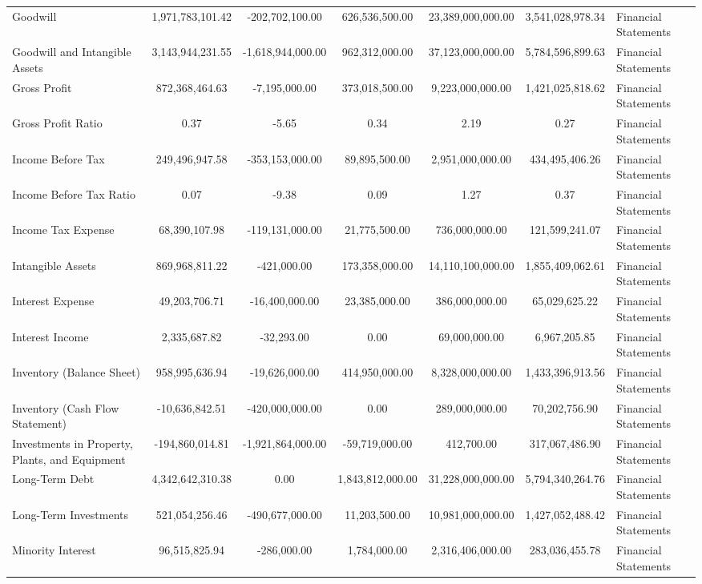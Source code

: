 \begin{tabular}{lccccc}
Goodwill & 1,971,783,101.42 & -202,702,100.00 & 626,536,500.00 & 23,389,000,000.00 & 3,541,028,978.34 & Financial Statements \\
Goodwill and Intangible Assets & 3,143,944,231.55 & -1,618,944,000.00 & 962,312,000.00 & 37,123,000,000.00 & 5,784,596,899.63 & Financial Statements \\
Gross Profit & 872,368,464.63 & -7,195,000.00 & 373,018,500.00 & 9,223,000,000.00 & 1,421,025,818.62 & Financial Statements \\
Gross Profit Ratio & 0.37 & -5.65 & 0.34 & 2.19 & 0.27 & Financial Statements \\
Income Before Tax & 249,496,947.58 & -353,153,000.00 & 89,895,500.00 & 2,951,000,000.00 & 434,495,406.26 & Financial Statements \\
Income Before Tax Ratio & 0.07 & -9.38 & 0.09 & 1.27 & 0.37 & Financial Statements \\
Income Tax Expense & 68,390,107.98 & -119,131,000.00 & 21,775,500.00 & 736,000,000.00 & 121,599,241.07 & Financial Statements \\
Intangible Assets & 869,968,811.22 & -421,000.00 & 173,358,000.00 & 14,110,100,000.00 & 1,855,409,062.61 & Financial Statements \\
Interest Expense & 49,203,706.71 & -16,400,000.00 & 23,385,000.00 & 386,000,000.00 & 65,029,625.22 & Financial Statements \\
Interest Income & 2,335,687.82 & -32,293.00 & 0.00 & 69,000,000.00 & 6,967,205.85 & Financial Statements \\
Inventory (Balance Sheet) & 958,995,636.94 & -19,626,000.00 & 414,950,000.00 & 8,328,000,000.00 & 1,433,396,913.56 & Financial Statements \\
Inventory (Cash Flow Statement) & -10,636,842.51 & -420,000,000.00 & 0.00 & 289,000,000.00 & 70,202,756.90 & Financial Statements \\
Investments in Property, Plants, and Equipment & -194,860,014.81 & -1,921,864,000.00 & -59,719,000.00 & 412,700.00 & 317,067,486.90 & Financial Statements \\
Long-Term Debt & 4,342,642,310.38 & 0.00 & 1,843,812,000.00 & 31,228,000,000.00 & 5,794,340,264.76 & Financial Statements \\
Long-Term Investments & 521,054,256.46 & -490,677,000.00 & 11,203,500.00 & 10,981,000,000.00 & 1,427,052,488.42 & Financial Statements \\
Minority Interest & 96,515,825.94 & -286,000.00 & 1,784,000.00 & 2,316,406,000.00 & 283,036,455.78 & Financial Statements \\

\end{tabular}
